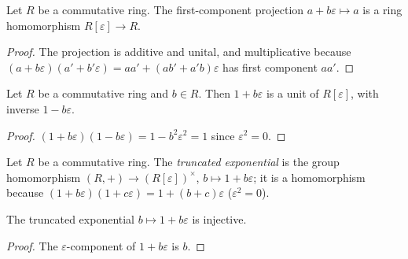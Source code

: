 \begin{lemma}\leanok
  \label{lem:dual_number_fst_ring_hom}
  Let \(R\) be a commutative ring. The first-component projection
  \(a + b\varepsilon \mapsto a\) is a ring homomorphism
  \(R[\varepsilon] \to R\).
\end{lemma}

\begin{proof}\leanok
  The projection is additive and unital, and multiplicative because
  \((a + b\varepsilon)(a' + b'\varepsilon)
  = aa' + (ab' + a'b)\varepsilon\) has first component \(aa'\).
\end{proof}

\begin{lemma}\leanok
  \label{lem:dual_number_trunc_exp_unit}
  Let \(R\) be a commutative ring and \(b \in R\). Then
  \(1 + b\varepsilon\) is a unit of \(R[\varepsilon]\), with inverse
  \(1 - b\varepsilon\).
\end{lemma}

\begin{proof}\leanok
  \((1 + b\varepsilon)(1 - b\varepsilon) = 1 - b^2\varepsilon^2 = 1\)
  since \(\varepsilon^2 = 0\).
\end{proof}

\begin{definition}\leanok
  \label{def:dual_number_trunc_exp}
  Let \(R\) be a commutative ring. The \emph{truncated exponential} is
  the group homomorphism
  \((R, +) \to (R[\varepsilon])^{\times}\), \(b \mapsto 1 + b\varepsilon\);
  it is a homomorphism because
  \((1 + b\varepsilon)(1 + c\varepsilon) = 1 + (b + c)\varepsilon\)
  (\(\varepsilon^2 = 0\)).
\end{definition}

\begin{lemma}\leanok
  \label{lem:dual_number_trunc_exp_injective}
  The truncated exponential \(b \mapsto 1 + b\varepsilon\) is injective.
\end{lemma}

\begin{proof}\leanok
  The \(\varepsilon\)-component of \(1 + b\varepsilon\) is \(b\).
\end{proof}


